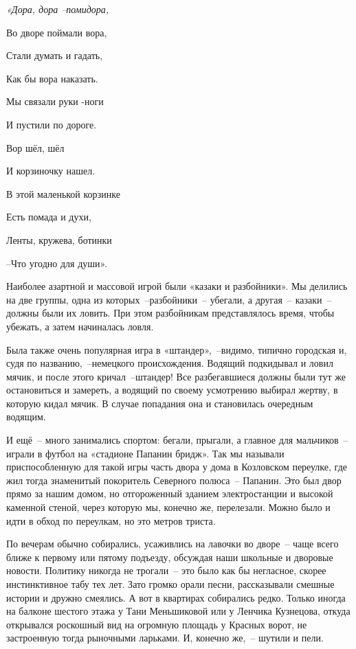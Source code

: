 \indent

{\itshape
«Дора, дора --помидора,

 Во дворе поймали вора,
 
  Стали думать и гадать,
  
Как бы вора наказать.

Мы связали руки -ноги
 
И пустили по дороге. 

Вор шёл, шёл 

И корзиночку нашел. 

В этой маленькой корзинке 

Есть помада и духи, 

Ленты, кружева, ботинки
 
--Что угодно для души».

}

\indent

Наиболее азартной и массовой игрой были «казаки и разбойники». Мы делились на две группы, одна из которых~--разбойники~-- убегали, а другая~-- казаки~-- должны были их ловить. При этом разбойникам представлялось время, чтобы убежать, а затем начиналась ловля.

Была также очень популярная игра в «штандер»,~--видимо, типично городская и, судя по названию,~--немецкого происхождения. Водящий подкидывал и ловил мячик, и после этого кричал~--штандер! Все разбегавшиеся должны были тут же остановиться и замереть, а водящий по своему усмотрению выбирал жертву, в которую кидал мячик. В случае попадания она и становилась очередным водящим.

И ещё~-- много занимались спортом: бегали, прыгали, а главное для мальчиков~-- играли в футбол на «стадионе Папанин бридж». Так мы называли приспособленную для такой игры часть двора у дома в Козловском переулке, где жил тогда знаменитый покоритель Северного полюса~-- Папанин. Это был двор прямо за нашим домом, но отгороженный зданием электростанции и высокой каменной стеной, через которую мы, конечно же, перелезали. Можно было и идти в обход по переулкам, но это метров триста.

По вечерам обычно собирались, усаживлись на лавочки во дворе~-- чаще всего ближе к первому или пятому подъезду, обсуждая наши школьные и дворовые новости. Политику никогда не трогали~-- это было как бы негласное, скорее инстинктивное табу тех лет. Зато громко орали песни, рассказывали смешные истории и дружно смеялись. А вот в квартирах собирались редко. Только иногда на балконе шестого этажа у Тани Меньшиковой или у Ленчика Кузнецова, откуда открывался роскошный вид на огромную площадь у Красных ворот, не застроенную тогда рыночными ларьками. И, конечно же,~-- шутили и пели.

